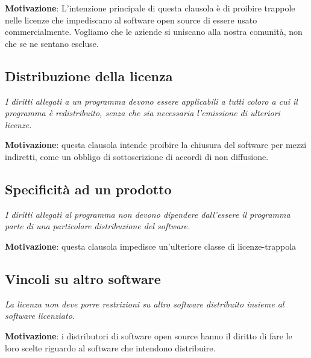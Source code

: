 \textbf{Motivazione}: L'intenzione principale di questa clausola è di proibire trappole nelle licenze che impediscano al software open source di essere usato commercialmente. Vogliamo che le aziende si uniscano alla nostra comunità, non che se ne sentano escluse.

\subsection{Distribuzione della licenza}

\begin{center}

\textit{I diritti allegati a un programma devono essere applicabili a tutti coloro a cui il programma è redistribuito, senza che sia necessaria l'emissione di ulteriori licenze.}

\end{center}

\textbf{Motivazione}: questa clausola intende proibire la chiusura del software per mezzi indiretti, come un obbligo di sottoscrizione di accordi di non diffusione.

\subsection{Specificità ad un prodotto}

\begin{center}

\textit{I diritti allegati al programma non devono dipendere dall'essere il programma parte di una particolare distribuzione del software.}

\end{center}

\textbf{Motivazione}: questa clausola impedisce un'ulteriore classe di licenze-trappola

\subsection{Vincoli su altro software}

\begin{center}

\textit{La licenza non deve porre restrizioni su altro software distribuito insieme al software licenziato.}

\end{center}

\textbf{Motivazione}: i distributori di software open source hanno il diritto di fare le loro scelte riguardo al software che intendono distribuire.

